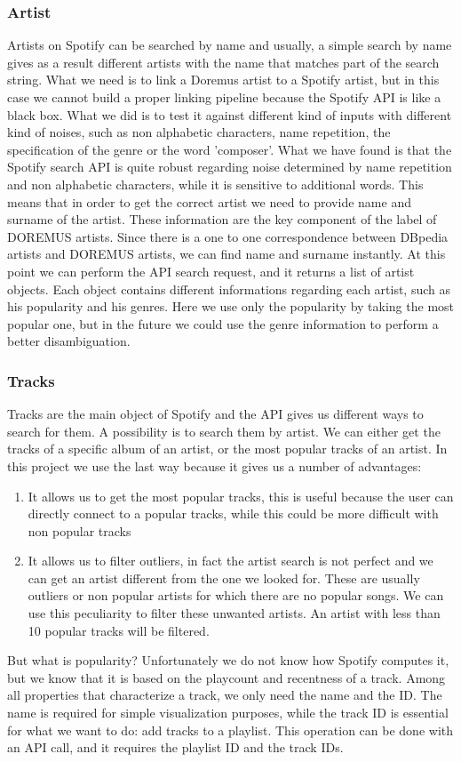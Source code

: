 \documentclass[paper=a4, fontsize=11pt]{scrartcl}
\begin{document}
\subsubsection{Artist}
Artists on Spotify can be searched by name and usually, a simple search by name gives as a result different artists with the name that matches part of the search string.
What we need is to link a Doremus artist to a Spotify artist, but in this case we cannot build a proper linking pipeline because the Spotify API is like a black box. What we did is to test it against different kind of inputs with different kind of noises, such as non alphabetic characters, name repetition, the specification of the genre or the word 'composer'. What we have found is that the Spotify search API is quite robust regarding noise determined by name repetition and non alphabetic characters, while it is sensitive to additional words. This means that in order to get the correct artist we need to provide name and surname of the artist. These information are the key component of the label of DOREMUS artists. Since there is a one to one correspondence between DBpedia artists and DOREMUS artists, we can find name and surname instantly. At this point we can perform the API search request, and it returns a list of artist objects. Each object contains different informations regarding each artist, such as his popularity and his genres. Here we use only the popularity by taking the most popular one, but in the future we could use the genre information to perform a better disambiguation.

\subsubsection{Tracks}
Tracks are the main object of Spotify and the API gives us different ways to search for them. A possibility is to search them by artist. We can either get the tracks of a specific album of an artist, or the most popular tracks of an artist. In this project we use the last way because it gives us a number of advantages:
\begin{enumerate}
\item It allows us to get the most popular tracks, this is useful because the user can directly connect to a popular tracks, while this could be more difficult with non popular tracks
\item It allows us to filter outliers, in fact the artist search is not perfect and we can get an artist different from the one we looked for. These are usually outliers or non popular artists for which there are no popular songs. We can use this peculiarity to filter these unwanted artists. An artist with less than 10 popular tracks will be filtered.
\end{enumerate}
But what is popularity? Unfortunately we do not know how Spotify computes it, but we know that it is based on the playcount and recentness of a track.
Among all properties that characterize a track, we only need the name and the ID.
The name is required for simple visualization purposes, while the track ID is essential for what we want to do: add tracks to a playlist. This operation can be done with an API call, and it requires the playlist ID and the track IDs.
\end{document}
